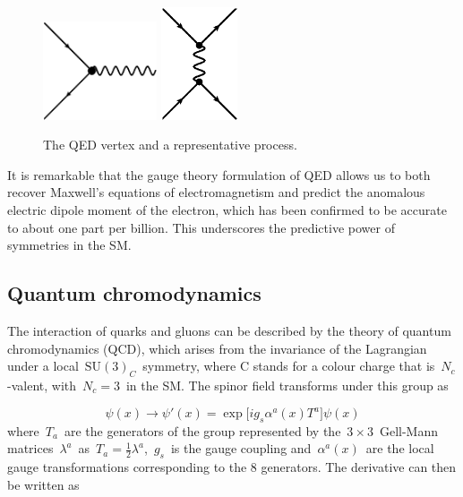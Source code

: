\begin{figure}
\begin{centering}
\includegraphics[width=0.3\textwidth]{figures/theory/qed_vertex.eps}
\includegraphics[width=0.2\textwidth]{figures/theory/qed_process.eps}
\caption{The QED vertex and a representative process.}
\label{fig:theory_qed}
\end{centering}
\end{figure}

It is remarkable that the gauge theory formulation of QED allows us to both recover Maxwell's equations of electromagnetism and predict the anomalous electric dipole moment of the electron, which has been confirmed to be accurate to about one part per billion. This underscores the predictive power of symmetries in the SM.

\subsection{Quantum chromodynamics}
\label{sec:theory_qcd}
The interaction of quarks and gluons can be described by the theory of quantum chromodynamics (QCD), which arises from the invariance of the Lagrangian under a local~$\mathrm{SU}(3)_C$~symmetry, where C stands for a colour charge that is~$N_c$-valent, with~$N_c = 3$~in the SM. The spinor field transforms under this group as

\begin{equation}
\psi(x) \rightarrow \psi'(x) = \exp \bigl[ i g_s \alpha^a(x) T^a \bigr] \psi(x)
\end{equation}
where~$T_a$~are the generators of the group represented by the~$3\times3$~Gell-Mann matrices~$\lambda^a$~as~$T_a = \frac{1}{2} \lambda^a$,~$g_s$~is the gauge coupling and~$\alpha^a(x)$~are the local gauge transformations corresponding to the 8 generators. The derivative can then be written as


